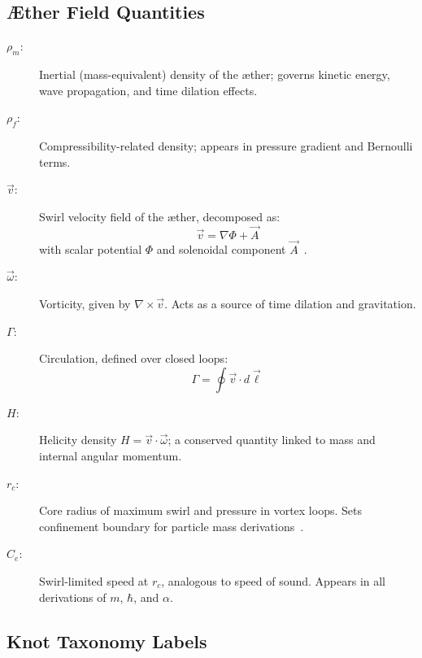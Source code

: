 \documentclass[preprint]{revtex4-2}
\begin{document}
            \subsection*{Æther Field Quantities}
            \begin{description}
                \item[$\rho_{\scriptscriptstyle\boldsymbol\!m}$:] Inertial (mass-equivalent) density of the æther; governs kinetic energy, wave propagation, and time dilation effects.
                \item[$\rho_{\scriptscriptstyle\boldsymbol\!f}$:] Compressibility-related density; appears in pressure gradient and Bernoulli terms.
                \item[$\vec{v}$:] Swirl velocity field of the æther, decomposed as:
                \[
                \vec{v} = \nabla \Phi + \vec{A}
                \]
                with scalar potential $\Phi$ and solenoidal component $\vec{A}$~\cite{kleckner2013knots}.
                \item[$\vec{\omega}$:] Vorticity, given by $\nabla \times \vec{v}$. Acts as a source of time dilation and gravitation.
                \item[$\Gamma$:] Circulation, defined over closed loops:
                \[
                \Gamma = \oint \vec{v} \cdot d\vec{\ell}
                \]
                \item[$H$:] Helicity density $H = \vec{v} \cdot \vec{\omega}$; a conserved quantity linked to mass and internal angular momentum.
                \item[$r_c$:] Core radius of maximum swirl and pressure in vortex loops. Sets confinement boundary for particle mass derivations~\cite{verlinde2011origin}.
                \item[$C_e$:] Swirl-limited speed at $r_c$, analogous to speed of sound. Appears in all derivations of $m$, $\hbar$, and $\alpha$.
            \end{description}
        
            \subsection*{Knot Taxonomy Labels}
        
\end{document}
